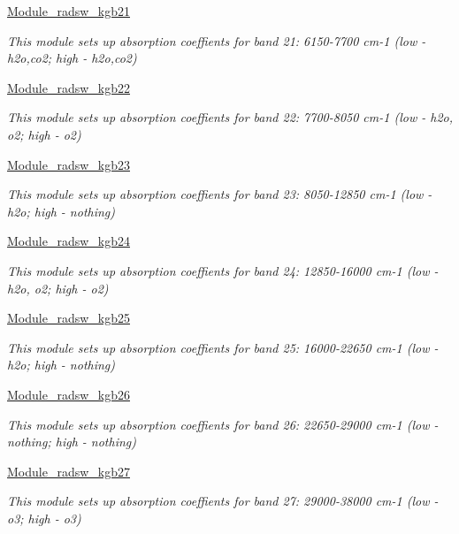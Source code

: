 \begin{DoxyCompactItemize}
\hyperlink{group__module__radsw__kgb21}{Module\+\_\+radsw\+\_\+kgb21}
\begin{DoxyCompactList}\small\item\em This module sets up absorption coeffients for band 21\+: 6150-\/7700 cm-\/1 (low -\/ h2o,co2; high -\/ h2o,co2) \end{DoxyCompactList}\item 
\hyperlink{group__module__radsw__kgb22}{Module\+\_\+radsw\+\_\+kgb22}
\begin{DoxyCompactList}\small\item\em This module sets up absorption coeffients for band 22\+: 7700-\/8050 cm-\/1 (low -\/ h2o, o2; high -\/ o2) \end{DoxyCompactList}\item 
\hyperlink{group__module__radsw__kgb23}{Module\+\_\+radsw\+\_\+kgb23}
\begin{DoxyCompactList}\small\item\em This module sets up absorption coeffients for band 23\+: 8050-\/12850 cm-\/1 (low -\/ h2o; high -\/ nothing) \end{DoxyCompactList}\item 
\hyperlink{group__module__radsw__kgb24}{Module\+\_\+radsw\+\_\+kgb24}
\begin{DoxyCompactList}\small\item\em This module sets up absorption coeffients for band 24\+: 12850-\/16000 cm-\/1 (low -\/ h2o, o2; high -\/ o2) \end{DoxyCompactList}\item 
\hyperlink{group__module__radsw__kgb25}{Module\+\_\+radsw\+\_\+kgb25}
\begin{DoxyCompactList}\small\item\em This module sets up absorption coeffients for band 25\+: 16000-\/22650 cm-\/1 (low -\/ h2o; high -\/ nothing) \end{DoxyCompactList}\item 
\hyperlink{group__module__radsw__kgb26}{Module\+\_\+radsw\+\_\+kgb26}
\begin{DoxyCompactList}\small\item\em This module sets up absorption coeffients for band 26\+: 22650-\/29000 cm-\/1 (low -\/ nothing; high -\/ nothing) \end{DoxyCompactList}\item 
\hyperlink{group__module__radsw__kgb27}{Module\+\_\+radsw\+\_\+kgb27}
\begin{DoxyCompactList}\small\item\em This module sets up absorption coeffients for band 27\+: 29000-\/38000 cm-\/1 (low -\/ o3; high -\/ o3) \end{DoxyCompactList}\item 

\end{DoxyCompactItemize}
